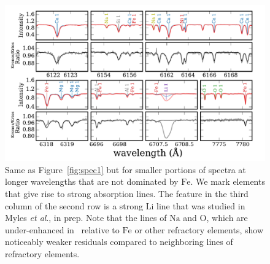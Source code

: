 \documentclass[12pt,letterpaper,margin=1in]{article}
\newcommand{\figname}{Figure}
\newcommand{\etal}{\textit{et al}.}
\newcommand*\elem[1]{\ensuremath{\mathrm{#1}}}
\newcommand{\bizarreone}{\text{Kronos}}
\begin{document}
\begin{figure}[htpb]
  \centering
  \includegraphics[width=0.95\linewidth]{spec2.pdf}
  \caption{Same as \figname~\ref{fig:spec1}
    but for smaller portions of spectra at longer wavelengths that are
    not dominated by \elem{Fe}.
    We mark elements that give rise to strong absorption lines.
    The feature in the third column of the second row is a strong \elem{Li}
    line that was studied in Myles \etal, in prep.
    Note that the lines of \elem{Na} and \elem{O}, which are under-enhanced
    in \bizarreone\ relative to \elem{Fe} or other refractory elements,
    show noticeably weaker residuals compared to neighboring lines of
    refractory elements.
  }
  \label{fig:spec2}
\end{figure}
\end{document}
